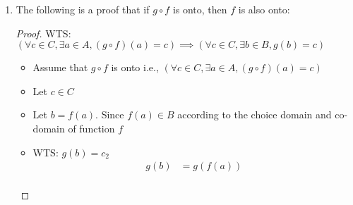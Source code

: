 \documentclass[12pt]{article}
\theoremstyle{definition}
\begin{document}
\begin{enumerate}
\begin{enumerate}[i]
\begin{proof}
            $(\left. \forall a_1, a_2 \in A, (g \circ f)(a_1) = (g \circ f)(a_2) \implies (f(a_1) = f(a_2) \right.) \implies (\left. \forall p, q \in A, f(p) = f(q) \implies p = q \right.)$ \\
            \begin{itemize}
                \item Assume $g \circ f$ is one-to-one i.e., $(\left. \forall a_1, a_2 \in A, (g \circ f)(a_1) = (g \circ f)(a_2) \implies (f(a_1) = f(a_2) \right.)$
                \item let $p, q \in A$
                \item Assume $f(p) = f(q)$ 
                \item WTS: $p = q$
                \begin{align*}
                    g(f(p)) &= g(f(q)) \\
                    (g \circ f)(p) &= (g\circ f)(q) \tag{By definition of composite functions} \\
                \end{align*}
                \item Using our assumption that $g \circ f$ is one-to-one, we can conclude that:
                \begin{align*}
                    p &= q 
                \end{align*}
            \end{itemize}
            \end{proof}
            \item The following is a proof that if $g \circ f$ is onto, then $f$ is also onto:
            \begin{proof} WTS: \\ 
                $(\left. \forall c \in C, \exists a \in A, (g \circ f)(a) = c \right.) \implies (\left. \forall c \in C, \exists b \in B, g(b) = c \right.)$
                \begin{itemize}
                    \item Assume that $g \circ f$ is onto i.e., $(\left. \forall c \in C, \exists a \in A, (g \circ f)(a) = c \right.)$
                    \item Let $c \in C$
                    \item Let $b = f(a)$. Since $f(a) \in B$ according to the choice domain and co-domain of function $f$
                    \item WTS: $g(b) = c_2$
                    \begin{align*}
                        g(b) &= g(f(a)) \\

\end{align*}
\end{itemize}
\end{proof}
\end{enumerate}
\end{enumerate}
\end{document}

